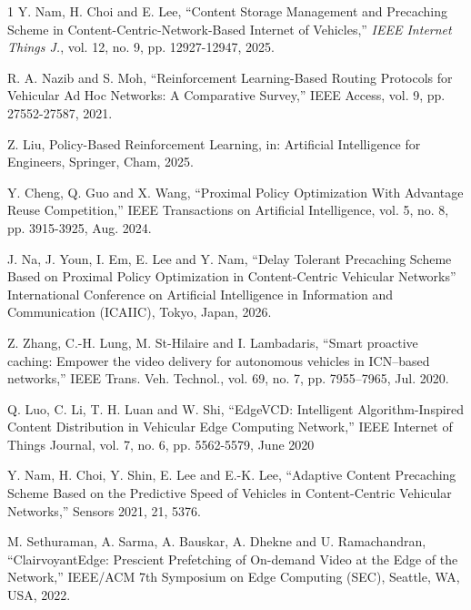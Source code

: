 \begin{thebibliography}{1}
Y. Nam, H. Choi and E. Lee, ``Content Storage Management and Precaching Scheme in Content-Centric-Network-Based Internet of Vehicles,'' \emph{IEEE Internet Things J.}, vol. 12, no. 9, pp. 12927-12947, 2025.

R. A. Nazib and S. Moh, ``Reinforcement Learning-Based Routing Protocols for Vehicular Ad Hoc Networks: A Comparative Survey,'' IEEE Access, vol. 9, pp. 27552-27587, 2021.

Z. Liu, Policy-Based Reinforcement Learning, in: Artificial Intelligence for Engineers, Springer, Cham, 2025.


Y. Cheng, Q. Guo and X. Wang, ``Proximal Policy Optimization With Advantage Reuse Competition,'' IEEE Transactions on Artificial Intelligence, vol. 5, no. 8, pp. 3915-3925, Aug. 2024.

J. Na, J. Youn, I. Em, E. Lee and Y. Nam, ``Delay Tolerant Precaching Scheme Based on Proximal Policy Optimization in Content-Centric Vehicular Networks'' International Conference on Artificial Intelligence in Information and Communication (ICAIIC), Tokyo, Japan, 2026.


Z. Zhang, C.-H. Lung, M. St-Hilaire and I. Lambadaris, ``Smart proactive caching: Empower the video delivery for autonomous vehicles in ICN–based networks,'' IEEE Trans. Veh. Technol., vol. 69, no. 7, pp. 7955–7965, Jul. 2020.

Q. Luo, C. Li, T. H. Luan and W. Shi, ``EdgeVCD: Intelligent Algorithm-Inspired Content Distribution in Vehicular Edge Computing Network,'' IEEE Internet of Things Journal, vol. 7, no. 6, pp. 5562-5579, June 2020

Y. Nam, H. Choi, Y. Shin, E. Lee and E.-K.  Lee, ``Adaptive Content Precaching Scheme Based on the Predictive Speed of Vehicles in Content-Centric Vehicular Networks,'' Sensors 2021, 21, 5376.


M. Sethuraman, A. Sarma, A. Bauskar, A. Dhekne and U. Ramachandran, ``ClairvoyantEdge: Prescient Prefetching of On-demand Video at the Edge of the Network,'' IEEE/ACM 7th Symposium on Edge Computing (SEC), Seattle, WA, USA, 2022.



\end{thebibliography}
